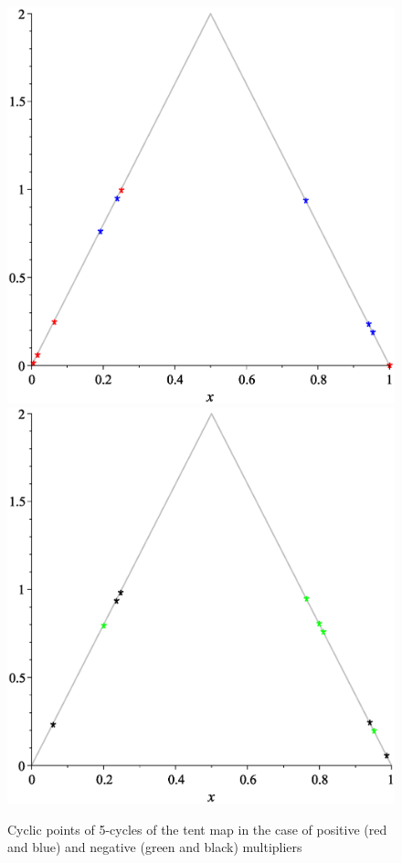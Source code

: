 \documentclass[12pt,a4paper]{amsart}
\begin{document}
\begin{figure}[h!]
\centering
\includegraphics[scale=0.28]{Fig3a}
\hspace{1cm}
\includegraphics[scale=0.28]{Fig3b}
\caption{Cyclic points of 5-cycles of the tent map in the case of positive (red and blue) and negative (green and black) multipliers} \label{f3}
\end{figure}
\end{document}
